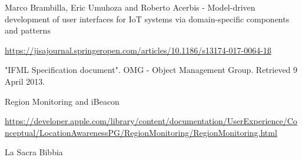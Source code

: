 

\begin{thebibliography}{90}

Marco Brambilla, Eric Umuhoza and Roberto Acerbis - Model-driven development of user interfaces for IoT systems via domain-specific components and patterns

\url{https://jisajournal.springeropen.com/articles/10.1186/s13174-017-0064-1ß}
    
"IFML Specification document". OMG - Object Management Group. Retrieved 9 April 2013.

Region Monitoring and iBeacon

\url{https://developer.apple.com/library/content/documentation/UserExperience/Conceptual/LocationAwarenessPG/RegionMonitoring/RegionMonitoring.html}
    

La Sacra Bibbia

\end{thebibliography}



